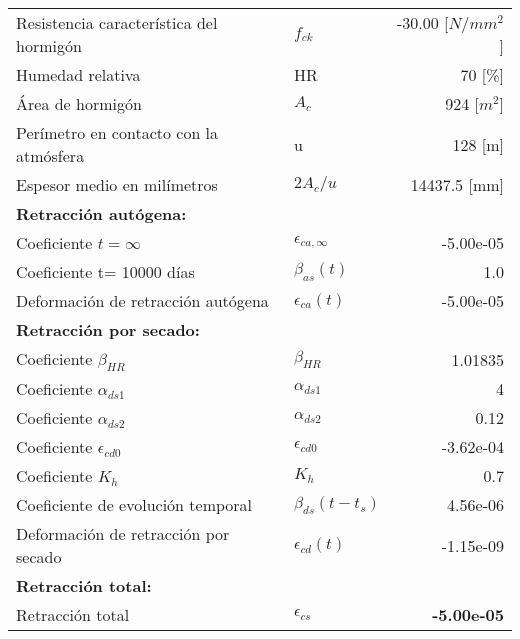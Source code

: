 \begin{center}
\begin{tabular}{llr}
Resistencia característica del hormigón & $ f_{ck}$ & -30.00 [$N/mm^2$] \\
Humedad relativa & HR & 70 [\%] \\
Área de hormigón & $A_c$ & 924 [$m^2$] \\
Perímetro en contacto con la atmósfera & u & 128 [m] \\
Espesor medio en milímetros & $2A_c/u$ & 14437.5 [mm] \\
\multicolumn{3}{l}{\textbf{Retracción autógena:}} \\
Coeficiente $t=\infty$ & $\epsilon_{ca,\infty}$ & -5.00e-05 \\
Coeficiente t= 10000 días & $\beta_{as}(t)$ & 1.0 \\
Deformación de retracción autógena & $\epsilon_{ca}(t)$ & -5.00e-05 \\
\multicolumn{3}{l}{\textbf{Retracción por secado: }} \\
Coeficiente $\beta_{HR}$ & $\beta_{HR}$ & 1.01835 \\
Coeficiente $\alpha_{ds1}$ & $\alpha_{ds1}$ & 4 \\
Coeficiente $\alpha_{ds2}$ & $\alpha_{ds2}$ & 0.12 \\
Coeficiente $\epsilon_{cd0}$ & $\epsilon_{cd0}$ & -3.62e-04 \\
Coeficiente $K_{h}$ & $K_{h}$ & 0.7 \\
Coeficiente de evolución temporal & $\beta_{ds}(t-t_s)$ & 4.56e-06 \\
Deformación de retracción por secado & $\epsilon_{cd}(t)$ & -1.15e-09 \\
\multicolumn{3}{l}{\textbf{Retracción total:}} \\
Retracción total & $\epsilon_{cs}$ & \textbf{-5.00e-05} \\
\end{tabular}
\end{center}
